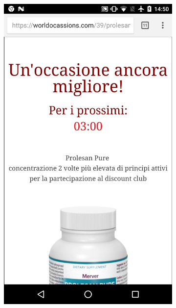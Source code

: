 \begin{figure}[h]
\begin{center}
\begin{subfigure}{.18\textwidth}
\begin{center}
        \includegraphics[scale=0.06]{figs/mobile_3}
        \caption{}
    \end{center}
    \end{subfigure}
    \begin{subfigure}{.18\textwidth}
    \begin{center}

\end{center}
\end{subfigure}
\end{center}
\end{figure}
